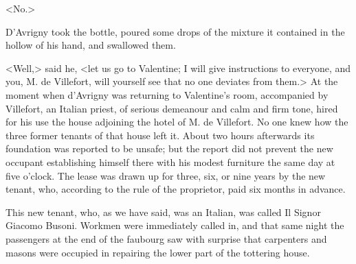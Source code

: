  <No.> 

 D'Avrigny took the bottle, poured some drops of the mixture it contained in the hollow of his hand, and swallowed them. 

 <Well,> said he, <let us go to Valentine; I will give instructions to everyone, and you, M. de Villefort, will yourself see that no one deviates from them.>  At the moment when d'Avrigny was returning to Valentine's room, accompanied by Villefort, an Italian priest, of serious demeanour and calm and firm tone, hired for his use the house adjoining the hotel of M. de Villefort. No one knew how the three former tenants of that house left it. About two hours afterwards its foundation was reported to be unsafe; but the report did not prevent the new occupant establishing himself there with his modest furniture the same day at five o'clock. The lease was drawn up for three, six, or nine years by the new tenant, who, according to the rule of the proprietor, paid six months in advance. 

 This new tenant, who, as we have said, was an Italian, was called Il Signor Giacomo Busoni. Workmen were immediately called in, and that same night the passengers at the end of the faubourg saw with surprise that carpenters and masons were occupied in repairing the lower part of the tottering house. 